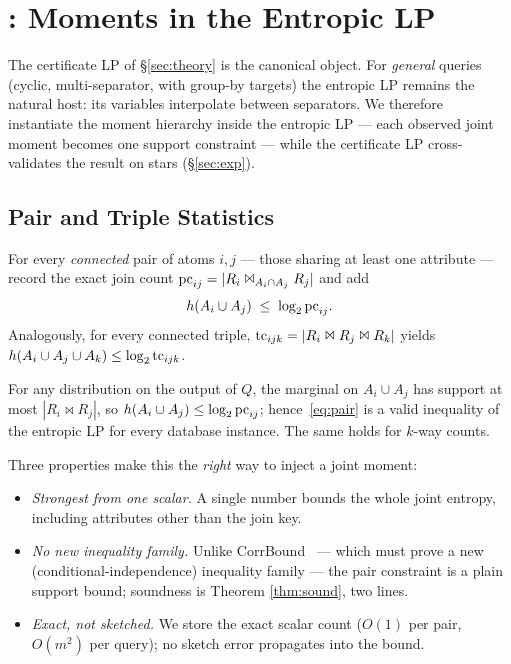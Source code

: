 \section{\framework{}: Moments in the Entropic LP}
\label{sec:method}

The certificate LP of \S\ref{sec:theory} is the canonical object.  For
\emph{general} queries (cyclic, multi-separator, with group-by
targets) the entropic LP remains the natural host: its variables
interpolate between separators.  We therefore instantiate the moment
hierarchy inside the entropic LP --- each observed joint moment
becomes one support constraint --- while the certificate LP
cross-validates the result on stars (\S\ref{sec:exp}).

\subsection{Pair and Triple Statistics}

\begin{definition}
\label{def:pairstat}
For every \emph{connected} pair of atoms $i,j$ --- those sharing at
least one attribute --- record the exact join count
$\text{pc}_{ij} = |R_i \Join_{A_i\cap A_j} R_j|$ and add
\begin{equation}
h(A_i \cup A_j) \;\le\; \log_2 \text{pc}_{ij} .
\label{eq:pair}
\end{equation}
Analogously, for every connected triple, $\text{tc}_{ijk} =
|R_i\Join R_j\Join R_k|$ yields $h(A_i\cup A_j\cup A_k) \le
\log_2\text{tc}_{ijk}$.
\end{definition}

\begin{theorem}[Soundness]
\label{thm:sound}
For any distribution on the output of $Q$, the marginal on
$A_i\cup A_j$ has support at most $|R_i\Join R_j|$, so
$h(A_i\cup A_j) \le \log_2\text{pc}_{ij}$; hence~\eqref{eq:pair} is a
valid inequality of the entropic LP for every database instance.
The same holds for $k$-way counts.
\end{theorem}

\noindent Three properties make this the \emph{right} way to inject a
joint moment:

\begin{itemize}[leftmargin=10pt,itemsep=1pt]
\item \emph{Strongest from one scalar.}  A single number bounds the
  whole joint entropy, including attributes other than the join key.
\item \emph{No new inequality family.}  Unlike
  CorrBound~\cite{mayer2026corrbound} --- which must prove a new
  (conditional-independence) inequality family --- the pair
  constraint is a plain support bound; soundness is Theorem
  \ref{thm:sound}, two lines.
\item \emph{Exact, not sketched.}  We store the exact scalar count
  ($O(1)$ per pair, $O(m^2)$ per query); no sketch error propagates
  into the bound.
\end{itemize}

